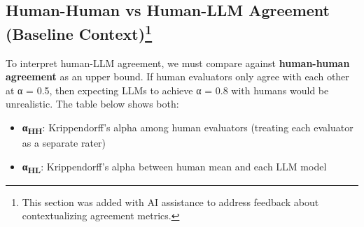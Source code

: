 \documentclass[
  11pt,
  letterpaper,
  DIV=11,
  numbers=noendperiod]{scrreprt}
\providecommand{\tightlist}{%
  \setlength{\itemsep}{0pt}\setlength{\parskip}{0pt}}
\begin{document}
\subsection[Human-Human vs Human-LLM Agreement (Baseline
Context)]{\texorpdfstring{Human-Human vs Human-LLM Agreement (Baseline
Context)\footnote{This section was added with AI assistance to address
  feedback about contextualizing agreement metrics.}}{Human-Human vs Human-LLM Agreement (Baseline Context)}}\label{human-human-vs-human-llm-agreement-baseline-contextresults_ratings-2}

To interpret human-LLM agreement, we must compare against
\textbf{human-human agreement} as an upper bound. If human evaluators
only agree with each other at α = 0.5, then expecting LLMs to achieve α
= 0.8 with humans would be unrealistic. The table below shows both:

\begin{itemize}
\tightlist
\item
  \textbf{α\textsubscript{HH}}: Krippendorff's alpha among human
  evaluators (treating each evaluator as a separate rater)
\item
  \textbf{α\textsubscript{HL}}: Krippendorff's alpha between human mean
  and each LLM model
\end{itemize}
\end{document}
